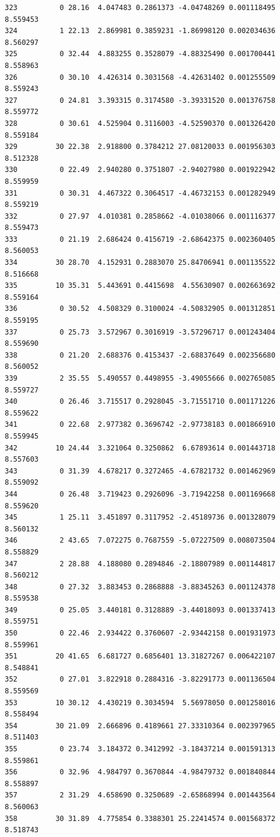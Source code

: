 \documentclass[]{book}
\theoremstyle{definition}
\theoremstyle{definition}
\theoremstyle{definition}
\theoremstyle{remark}
\begin{document}
\begin{verbatim}
323          0 28.16  4.047483 0.2861373 -4.04748269 0.001118495 8.559453
324          1 22.13  2.869981 0.3859231 -1.86998120 0.002034636 8.560297
325          0 32.44  4.883255 0.3528079 -4.88325490 0.001700441 8.558963
326          0 30.10  4.426314 0.3031568 -4.42631402 0.001255509 8.559243
327          0 24.81  3.393315 0.3174580 -3.39331520 0.001376758 8.559772
328          0 30.61  4.525904 0.3116003 -4.52590370 0.001326420 8.559184
329         30 22.38  2.918800 0.3784212 27.08120033 0.001956303 8.512328
330          0 22.49  2.940280 0.3751807 -2.94027980 0.001922942 8.559959
331          0 30.31  4.467322 0.3064517 -4.46732153 0.001282949 8.559219
332          0 27.97  4.010381 0.2858662 -4.01038066 0.001116377 8.559473
333          0 21.19  2.686424 0.4156719 -2.68642375 0.002360405 8.560053
334         30 28.70  4.152931 0.2883070 25.84706941 0.001135522 8.516668
335         10 35.31  5.443691 0.4415698  4.55630907 0.002663692 8.559164
336          0 30.52  4.508329 0.3100024 -4.50832905 0.001312851 8.559195
337          0 25.73  3.572967 0.3016919 -3.57296717 0.001243404 8.559690
338          0 21.20  2.688376 0.4153437 -2.68837649 0.002356680 8.560052
339          2 35.55  5.490557 0.4498955 -3.49055666 0.002765085 8.559727
340          0 26.46  3.715517 0.2928045 -3.71551710 0.001171226 8.559622
341          0 22.68  2.977382 0.3696742 -2.97738183 0.001866910 8.559945
342         10 24.44  3.321064 0.3250862  6.67893614 0.001443718 8.557603
343          0 31.39  4.678217 0.3272465 -4.67821732 0.001462969 8.559092
344          0 26.48  3.719423 0.2926096 -3.71942258 0.001169668 8.559620
345          1 25.11  3.451897 0.3117952 -2.45189736 0.001328079 8.560132
346          2 43.65  7.072275 0.7687559 -5.07227509 0.008073504 8.558829
347          2 28.88  4.188080 0.2894846 -2.18807989 0.001144817 8.560212
348          0 27.32  3.883453 0.2868888 -3.88345263 0.001124378 8.559538
349          0 25.05  3.440181 0.3128889 -3.44018093 0.001337413 8.559751
350          0 22.46  2.934422 0.3760607 -2.93442158 0.001931973 8.559961
351         20 41.65  6.681727 0.6856401 13.31827267 0.006422107 8.548841
352          0 27.01  3.822918 0.2884316 -3.82291773 0.001136504 8.559569
353         10 30.12  4.430219 0.3034594  5.56978050 0.001258016 8.558494
354         30 21.09  2.666896 0.4189661 27.33310364 0.002397965 8.511403
355          0 23.74  3.184372 0.3412992 -3.18437214 0.001591313 8.559861
356          0 32.96  4.984797 0.3670844 -4.98479732 0.001840844 8.558897
357          2 31.29  4.658690 0.3250689 -2.65868994 0.001443564 8.560063
358         30 31.89  4.775854 0.3388301 25.22414574 0.001568372 8.518743

\end{verbatim}
\end{document}
